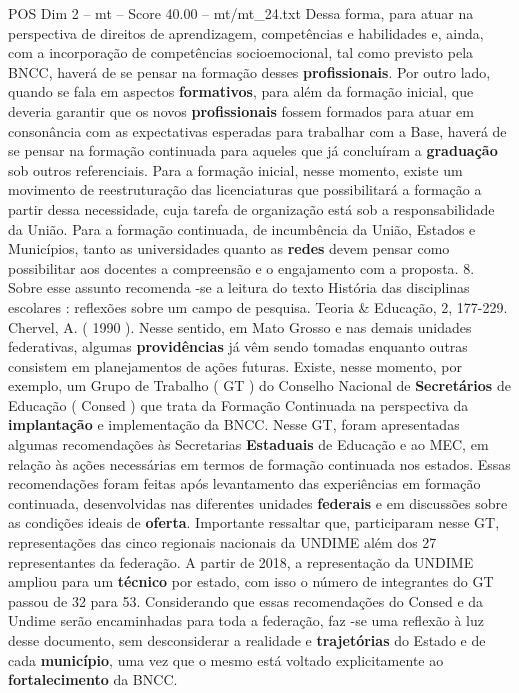 \begin{textsample}{POS Dim 2 – mt – Score 40.00 – mt/mt\_24.txt}
Dessa forma, para atuar na perspectiva de direitos de aprendizagem, competências e habilidades e, ainda, com a incorporação de competências socioemocional, tal como previsto pela BNCC, haverá de se pensar na formação desses \textbf{profissionais}.
Por outro lado, quando se fala em aspectos \textbf{formativos}, para além da formação inicial, que deveria garantir que os novos \textbf{profissionais} fossem formados para atuar em consonância com as expectativas esperadas para trabalhar com a Base, haverá de se pensar na formação continuada para aqueles que já concluíram a \textbf{graduação} sob outros referenciais.
Para a formação inicial, nesse momento, existe um movimento de reestruturação das licenciaturas que possibilitará a formação a partir dessa necessidade, cuja tarefa de organização está sob a responsabilidade da União.
Para a formação continuada, de incumbência da União, Estados e Municípios, tanto as universidades quanto as \textbf{redes} devem pensar como possibilitar aos docentes a compreensão e o engajamento com a proposta. 8.
Sobre esse assunto recomenda -se a leitura do texto História das disciplinas escolares : reflexões sobre um campo de pesquisa.
Teoria \& Educação, 2, 177-229.
Chervel, A. ( 1990 ).
Nesse sentido, em Mato Grosso e nas demais unidades federativas, algumas \textbf{providências} já vêm sendo tomadas enquanto outras consistem em planejamentos de ações futuras.
Existe, nesse momento, por exemplo, um Grupo de Trabalho ( GT ) do Conselho Nacional de \textbf{Secretários} de Educação ( Consed ) que trata da Formação Continuada na perspectiva da \textbf{implantação} e implementação da BNCC.
Nesse GT, foram apresentadas algumas recomendações às Secretarias \textbf{Estaduais} de Educação e ao MEC, em relação às ações necessárias em termos de formação continuada nos estados.
Essas recomendações foram feitas após levantamento das experiências em formação continuada, desenvolvidas nas diferentes unidades \textbf{federais} e em discussões sobre as condições ideais de \textbf{oferta}.
Importante ressaltar que, participaram nesse GT, representações das cinco regionais nacionais da UNDIME além dos 27 representantes da federação.
A partir de 2018, a representação da UNDIME ampliou para um \textbf{técnico} por estado, com isso o número de integrantes do GT passou de 32 para 53.
Considerando que essas recomendações do Consed e da Undime serão encaminhadas para toda a federação, faz -se uma reflexão à luz desse documento, sem desconsiderar a realidade e \textbf{trajetórias} do Estado e de cada \textbf{município}, uma vez que o mesmo está voltado explicitamente ao \textbf{fortalecimento} da BNCC.

\end{textsample}
